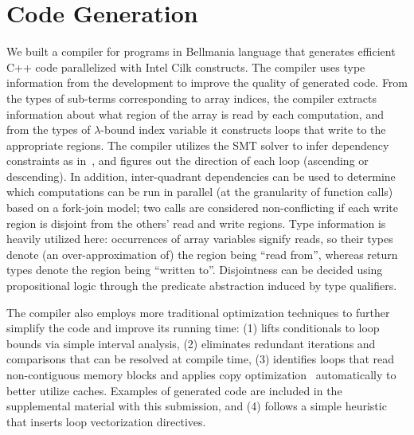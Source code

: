 \section{Code Generation}
\label{codegen}

We built a compiler for programs in Bellmania language that generates efficient C++ code parallelized with Intel Cilk constructs. The compiler uses type information from the development to improve the
quality of generated code. From the types of sub-terms corresponding
to array indices, the compiler extracts information about what region
of the array is read by each computation, and from the types of $\lambda$-bound index variable it constructs loops that write to
the appropriate regions. The compiler utilizes the SMT solver to infer dependency constraints as in~\cite{JACM67/Karp},
and figures out the direction of each loop (ascending or descending). 
In addition, inter-quadrant dependencies can be used to determine which computations can be run in parallel (at the granularity of
function calls) based on a fork-join model;
two calls are considered non-conflicting if each write region is disjoint from the others' read and write regions.
\cbstart{}%
Type information is heavily utilized here: occurrences of array variables signify reads,
so their types denote (an over-approximation of) the region being ``read from'',
whereas return types denote the region being ``written to''.
Disjointness can be decided using propositional logic through the predicate abstraction induced by type qualifiers.
\cbend

The compiler also employs more traditional optimization techniques
to further simplify the code and improve its running time:
(1) lifts conditionals to loop bounds via simple interval analysis, %
(2) eliminates redundant iterations and comparisons that can be resolved at compile time,
(3) identifies loops that read non-contiguous memory blocks and applies copy optimization~\cite{ASPLOS91/Lam} automatically to better utilize caches. Examples of generated code are included in the supplemental material with this submission,
and
\cbstart
(4) follows a simple heuristic that inserts loop vectorization directives.
\cbend
 

